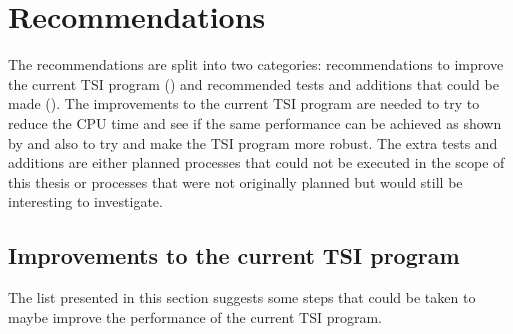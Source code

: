 \section{Recommendations}
\label{sec:recommendations}
The recommendations are split into two categories: recommendations to improve the current \ac{TSI} program () and recommended tests and additions that could be made (). The improvements to the current \ac{TSI} program are needed to try to reduce the CPU time and see if the same performance can be achieved as shown by \citep{scott2008high,bergsma2016application} and also to try and make the \ac{TSI} program more robust. The extra tests and additions are either planned processes that could not be executed in the scope of this thesis or processes that were not originally planned but would still be interesting to investigate.

\subsection{Improvements to the current \ac{TSI} program}
\label{subsec:improvementsToTheCurrentTSIprogram}
The list presented in this section suggests some steps that could be taken to maybe improve the performance of the current \ac{TSI} program. 

